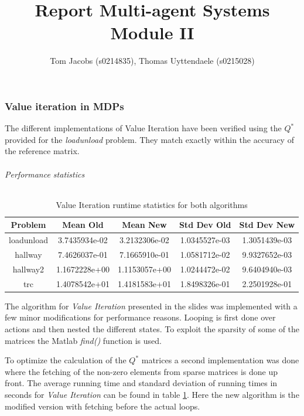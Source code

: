 \documentclass[10pt,a4paper]{article}
\title{Report Multi-agent Systems Module II}
\author{Tom Jacobs (s0214835), Thomas Uyttendaele (s0215028)}
\begin{document}
\maketitle
\part{}
\section{Value iteration in MDPs}
The different implementations of Value Iteration have been verified using the $Q^{*}$ provided for the \emph{loadunload} problem. They match exactly within the accuracy of the reference matrix.
\paragraph{Performance statistics}\hfill
\begin{table}[!h]


\centering
\begin{tabular}{ c | c | c | c | c}
Problem & Mean Old & Mean New & Std Dev Old & Std Dev New \\
\hline
loadunload & 3.7435934e-02 & 3.2132306e-02 & 1.0345527e-03 & 1.3051439e-03\\
hallway & 7.4626037e-01 & 7.1665910e-01 & 1.0581712e-02 & 9.9327652e-03\\
hallway2 & 1.1672228e+00 & 1.1153057e+00 & 1.0244472e-02 & 9.6404940e-03 \\
trc & 1.4078542e+01 & 1.4181583e+01 & 1.8498326e-01 & 2.2501928e-01\\
\end{tabular}
\caption{Value Iteration runtime statistics for both algorithms}
\label{table:vi}
\end{table}

The algorithm for \emph{Value Iteration} presented in the slides was implemented with a few minor modifications for performance reasons. 
Looping is first done over actions and then nested the different states. To exploit the sparsity of some of the matrices the Matlab \emph{find()} function is used.

To optimize the calculation of the $Q^{*}$ matrices a second implementation was done where the fetching of the non-zero elements from sparse matrices is done up front. 
The average running time and standard deviation of running times in seconds for \emph{Value Iteration} can be found in table \ref{table:vi}. 
Here the new algorithm is the modified version with fetching before the actual loops.
\end{document}
